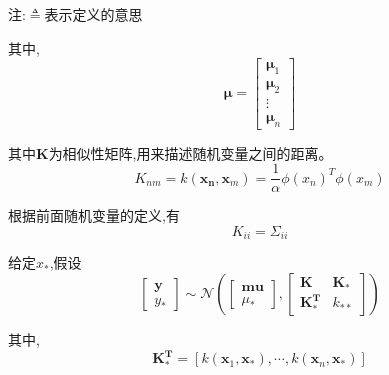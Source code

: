 \documentclass[UTF8,a4paper]{ctexart}
\begin{document}
            注:$\triangleq$表示定义的意思

            其中,
            \begin{equation}
                \bm \mu = \left [
                    \begin{array}{c}
                    \bm \mu_1 \\
                    \bm \mu_2\\
                    \vdots \\
                    \bm \mu_n
                    \end{array}
                \right ]
            \end{equation}

            其中$\bm{K}$为相似性矩阵,用来描述随机变量之间的距离。
            \begin{equation}
                K_{nm} = k(\bm{x_n} , \bm x_m) = \frac{1}{\alpha}\phi(x_n)^T\phi(x_m)
            \end{equation}

            根据前面随机变量的定义,有
            \begin{equation}
                K_{ii} = \Sigma_{ii}
            \end{equation}

            给定$x_*$,假设
            \begin{equation}
                \left [ \begin{array}{c}
                    \bm{y} \\ y_*
                \end{array} \right ] \sim \mathcal{N}
                \left (
                    \left [\begin{array}{c}
                    \bm{mu} \\ \mu_*
                    \end{array} \right ] ,
                    \left [\begin{array}{cc}
                    \bm{K} & \bm{K_*} \\
                    \bm{K_*^T} & k_{**}
                    \end{array} \right ]
                \right )
            \end{equation}

            其中,
            \begin{equation}
                \bm{K_*^T} = [ k(\bm x_1,\bm x_*) , \cdots , k(\bm x_n , \bm x_*) ]
            \end{equation}
\end{document}
